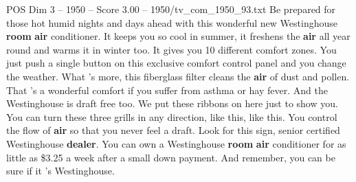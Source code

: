 \begin{textsample}{POS Dim 3 – 1950 – Score 3.00 – 1950/tv\_com\_1950\_93.txt}  \label{ex:f3_pos_020}
Be prepared for those hot humid nights and days ahead with this wonderful new Westinghouse \textbf{room} \textbf{air} conditioner.
It keeps you so cool in summer, it freshens the \textbf{air} all year round and warms it in winter too.
It gives you 10 different comfort zones.
You just push a single button on this exclusive comfort control panel and you change the weather.
What 's more, this fiberglass filter cleans the \textbf{air} of dust and pollen.
That 's a wonderful comfort if you suffer from asthma or hay fever.
And the Westinghouse is draft free too.
We put these ribbons on here just to show you.
You can turn these three grills in any direction, like this, like this.
You control the flow of \textbf{air} so that you never feel a draft.
Look for this sign, senior certified Westinghouse \textbf{dealer}.
You can own a Westinghouse \textbf{room} \textbf{air} conditioner for as little as \$3.25 a week after a small down payment.
And remember, you can be sure if it 's Westinghouse.

\end{textsample}
